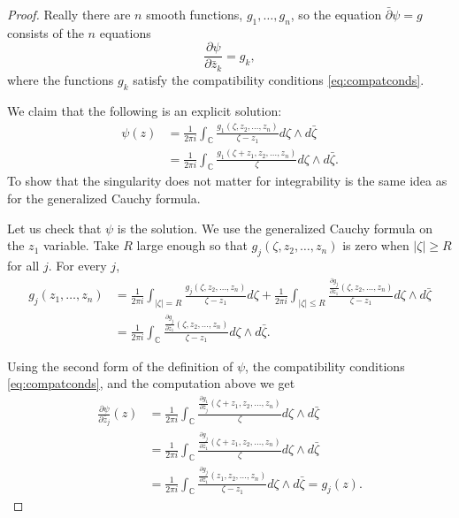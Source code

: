 \documentclass[12pt,openany]{book}
\newcommand{\sabs}[1]{\lvert {#1} \rvert}
\newcommand{\abs}[1]{\left\lvert {#1} \right\rvert}
\newcommand{\C}{{\mathbb{C}}}
\theoremstyle{plain}
\theoremstyle{remark}
\theoremstyle{definition}
\theoremstyle{exercise}
\theoremstyle{example}
\begin{document}
\begin{proof}
Really there are $n$ 
smooth functions, $g_1,\ldots,g_n$, so the equation $\bar{\partial} \psi = g$
consists of the $n$ equations
\begin{equation*}
\frac{\partial \psi}{\partial \bar{z}_k} = g_k ,
\end{equation*}
where the functions $g_k$ satisfy the compatibility conditions
\eqref{eq:compatconds}.

We claim that the following is an explicit solution:
\begin{equation*}
\begin{split}
\psi(z)
& =
\frac{1}{2\pi i}
\int_\C
\frac{
 g_1(\zeta,z_2,\ldots,z_n)
}{\zeta - z_1}
d\zeta \wedge d\bar{\zeta}
\\
& =
\frac{1}{2\pi i}
\int_\C
\frac{
 g_1(\zeta+z_1,z_2,\ldots,z_n)
}{\zeta}
d\zeta \wedge d\bar{\zeta} .
\end{split}
\end{equation*}
To show that the singularity does not matter for integrability is the same
idea as for the generalized Cauchy formula.

Let us check that $\psi$ is the solution.
We use the generalized Cauchy formula on the $z_1$
variable.
Take $R$ large enough so that 
$g_j(\zeta,z_2,\ldots,z_n)$ is zero when $\sabs{\zeta}\geq R$ for all $j$.
For every $j$,
\begin{equation*}
\begin{split}
g_j(z_1,\ldots,z_n) & =
\frac{1}{2\pi i}
\int_{\abs{\zeta}=R}
\frac{g_j(\zeta,z_2,\ldots,z_n)}{\zeta-z_1}
d \zeta
+
\frac{1}{2\pi i}
\int_{\abs{\zeta} \leq R}
\frac{\frac{\partial g_j}{\partial \bar{z}_1}(\zeta,z_2,\ldots,z_n)}{\zeta-z_1}
d\zeta \wedge d\bar{\zeta} 
\\
& =
\frac{1}{2\pi i}
\int_{\C}
\frac{\frac{\partial g_j}{\partial \bar{z}_1}(\zeta,z_2,\ldots,z_n)}{\zeta-z_1}
d\zeta \wedge d\bar{\zeta}  .
\end{split}
\end{equation*}

Using the second form of the definition of $\psi$, the
compatibility conditions \eqref{eq:compatconds}, and the computation above we get
\begin{equation*} 
\begin{split}
\frac{\partial\psi}{\partial \bar{z}_j}(z)
& =
\frac{1}{2\pi i}
\int_\C
\frac{
 \frac{\partial g_1}{\partial \bar{z}_j}(\zeta+z_1,z_2,\ldots,z_n)
}{\zeta}
d\zeta \wedge d\bar{\zeta} 
\\
& =
\frac{1}{2\pi i}
\int_\C
\frac{
 \frac{\partial g_j}{\partial \bar{z}_1}(\zeta+z_1,z_2,\ldots,z_n)
}{\zeta}
d\zeta \wedge d\bar{\zeta} 
\\
& =
\frac{1}{2\pi i}
\int_\C
\frac{
 \frac{\partial g_j}{\partial \bar{z}_1}(z_1,z_2,\ldots,z_n)
}{\zeta-z_1}
d\zeta \wedge d\bar{\zeta} 
=
g_j(z) .
\end{split}
\end{equation*}


\end{proof}
\end{document}

